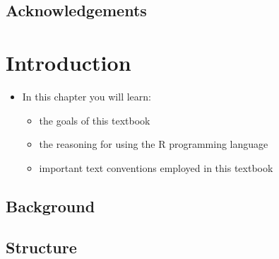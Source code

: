 \documentclass[]{book}
\providecommand{\tightlist}{%
  \setlength{\itemsep}{0pt}\setlength{\parskip}{0pt}}
\newenvironment{rmdblock}[1]
  {\begin{shaded*}
  \begin{itemize}
  \renewcommand{\labelitemi}{
    \raisebox{-.5\height}[0pt][0pt]{
      {\setkeys{Gin}{width=2em,keepaspectratio}\texttt{[image: images/\#1]}}
    }
  }
  \item
  }
  {
  \end{itemize}
  \end{shaded*}
  }
\newenvironment{rmdkey}
  {\begin{rmdblock}{key}}
  {\end{rmdblock}}
\begin{document}
\hypertarget{acknowledgements}{%
\section*{Acknowledgements}\label{acknowledgements}}

\hypertarget{introduction}{%
\chapter{Introduction}\label{introduction}}

\begin{rmdkey}
In this chapter you will learn:

\begin{itemize}
\tightlist
\item
  the goals of this textbook
\item
  the reasoning for using the R programming language
\item
  important text conventions employed in this textbook
\end{itemize}
\end{rmdkey}

\hypertarget{background}{%
\section{Background}\label{background}}

\hypertarget{structure}{%
\section{Structure}\label{structure}}


\end{document}

